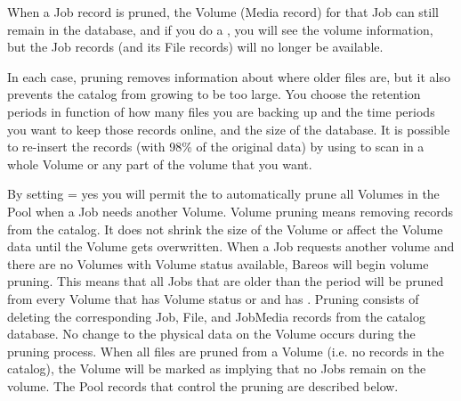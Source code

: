 When a Job record is pruned, the Volume (Media record) for that Job can still
remain in the database, and if you do a , you will see the
volume information, but the Job records (and its File records) will no longer
be available.

In each case, pruning removes information about where older files are, but it
also prevents the catalog from growing to be too large. You choose the
retention periods in function of how many files you are backing up and the
time periods you want to keep those records online, and the size of the
database.
It is possible to re-insert the records (with 98\% of the original data)
by using  to scan in a whole Volume or any part of the volume that
you want.

By setting  = yes you will permit
the \bareosDir to
automatically prune all Volumes in the Pool when a Job needs another Volume.
Volume pruning means removing records from the catalog. It does not shrink the
size of the Volume or affect the Volume data until the Volume gets
overwritten. When a Job requests another volume and there are no Volumes with
Volume status  available, Bareos will begin volume pruning. This
means that all Jobs that are older than the  period will
be pruned from every Volume that has Volume status  or 
and has . Pruning consists of deleting the
corresponding Job, File, and JobMedia records from the catalog database. No
change to the physical data on the Volume occurs during the pruning process.
When all files are pruned from a Volume (i.e. no records in the catalog), the
Volume will be marked as  implying that no Jobs remain on the
volume. The Pool records that control the pruning are described below.

